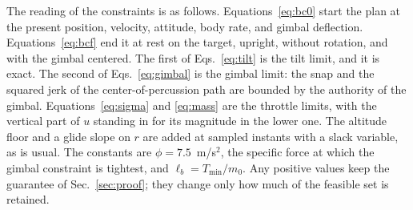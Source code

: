 \documentclass[10pt,letterpaper]{article}
\theoremstyle{aiaa}
\newcommand{\Tmin}{T_{\min}}
\begin{document}
The reading of the constraints is as follows. Equations~\eqref{eq:bc0} start the plan at the present position, velocity,
attitude, body rate, and gimbal deflection. Equations~\eqref{eq:bcf} end it at rest on the target, upright, without rotation,
and with the gimbal centered. The first of Eqs.~\eqref{eq:tilt} is the tilt limit, and it is exact. The second of
Eqs.~\eqref{eq:gimbal} is the gimbal limit: the snap and the squared jerk of the center-of-percussion path are bounded by the
authority of the gimbal. Equations~\eqref{eq:sigma} and \eqref{eq:mass} are the throttle limits, with the vertical part of $u$
standing in for its magnitude in the lower one. The altitude floor and a glide slope on $r$ are added at sampled instants with
a slack variable, as is usual. The constants are $\phi=7.5$~m/s$^2$, the specific force at which the gimbal constraint is
tightest, and $\ell_b=\Tmin/m_0$. Any positive values keep the guarantee of Sec.~\ref{sec:proof}; they change only how much of
the feasible set is retained.
\end{document}

